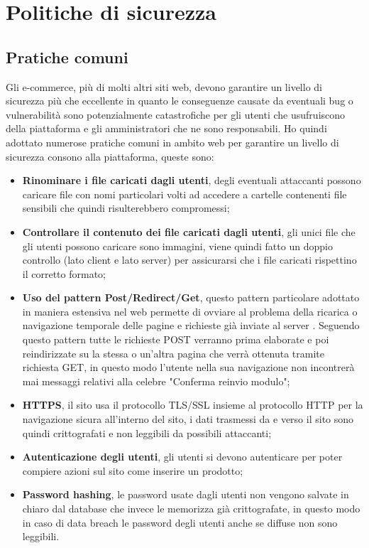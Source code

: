 \section{Politiche di sicurezza}
\subsection{Pratiche comuni}
Gli e-commerce, più di molti altri siti web, devono garantire un livello di sicurezza più che eccellente in quanto le conseguenze causate da eventuali bug o vulnerabilità sono potenzialmente catastrofiche per gli utenti che usufruiscono della piattaforma e gli amministratori che ne sono responsabili. Ho quindi adottato numerose pratiche comuni in ambito web per garantire un livello di sicurezza consono alla piattaforma, queste sono: 
\begin{itemize}
    \item \textbf{Rinominare i file caricati dagli utenti}, degli eventuali attaccanti possono caricare file con nomi particolari volti ad accedere a cartelle contenenti file sensibili che quindi risulterebbero compromessi; 
    \item \textbf{Controllare il contenuto dei file caricati dagli utenti}, gli unici file che gli utenti possono caricare sono immagini, viene quindi fatto un doppio controllo (lato client e lato server) per assicurarsi che i file caricati rispettino il corretto formato; 
    \item \textbf{Uso del pattern Post/Redirect/Get}, questo pattern particolare adottato in maniera estensiva nel web permette di ovviare al problema della ricarica o navigazione temporale delle pagine e richieste già inviate al server \cite{PRG}. Seguendo questo pattern tutte le richieste POST verranno prima elaborate e poi reindirizzate su la stessa o un'altra pagina che verrà ottenuta tramite richiesta GET, in questo modo l'utente nella sua navigazione non incontrerà mai messaggi relativi alla celebre "Conferma reinvio modulo"; 
    \item \textbf{HTTPS}, il sito usa il protocollo TLS/SSL insieme al protocollo HTTP per la navigazione sicura all'interno del sito, i dati trasmessi da e verso il sito sono quindi crittografati e non leggibili da possibili attaccanti; 
    \item \textbf{Autenticazione degli utenti}, gli utenti si devono autenticare per poter compiere azioni sul sito come inserire un prodotto; 
    \item \textbf{Password hashing}, le password usate dagli utenti non vengono salvate in chiaro dal database che invece le memorizza già crittografate, in questo modo in caso di data breach le password degli utenti anche se diffuse non sono leggibili.  
\end{itemize} 
